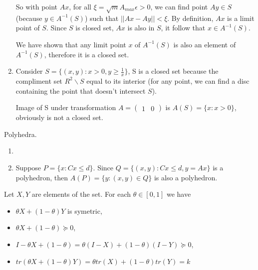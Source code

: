 \documentclass[12pt,letterpaper]{article}
\begin{document}
\begin{alphalist}
\begin{enumerate}[label=(\roman*)]
        So with point $Ax$, for all $\xi = \sqrt{m}A_{max}\epsilon>0$, we can find
        point $Ay \in S$ (because $y \in A^{-1}(S)$) such that $|| Ax - Ay || < \xi$. By definition, $Ax$
        is a limit point of $S$. Since $S$ is closed set, $Ax$ is also in $S$,
        it follow that $x \in A^{-1}(S)$.

        We have shown that any limit point $x$ of $A^{-1}(S)$ is also an
        element of $A^{-1}(S)$, therefore it is a closed set.

    \item Consider $S = \{(x, y) : x > 0, y \ge \frac{1}{x}\}$, S is a closed
        set because the compliment set $R^2 \backslash S$ equal to its interior (for any
        point, we can find a disc containing the point that doesn't intersect
        $S$).

        Image of S under transformation $A = (\begin{smallmatrix} 1 & 0
        \end{smallmatrix})$ is $A(S) = \{ x : x > 0 \}$, obviously is not a
        closed set.

\end{enumerate} %

\item Polyhedra.

\begin{enumerate}[label=(\roman*)]
    \item

    \item Suppose $P = \{x : Cx \le d\}$. Since $Q = \{ (x, y) : Cx \le d,
        y = Ax \}$ is a polyhedron, then $A(P) = \{y : (x, y) \in Q\}$ is also a
        polyhedron.
\end{enumerate}

\item Let $X, Y$ are elements of the set. For each $\theta \in [0, 1]$ we have
    \begin{itemize}
        \item $\theta X + (1 - \theta)Y$ is symetric,
        \item $\theta X + (1 - \theta) \succeq 0$,
        \item $I - \theta X + (1 - \theta) = \theta(I - X) + (1-\theta)(I - Y) \succeq 0$,
        \item $tr(\theta X + (1- \theta)Y) = \theta tr(X) + (1 - \theta)tr(Y) = k$
    \end{itemize}


\end{alphalist}
\end{document}
